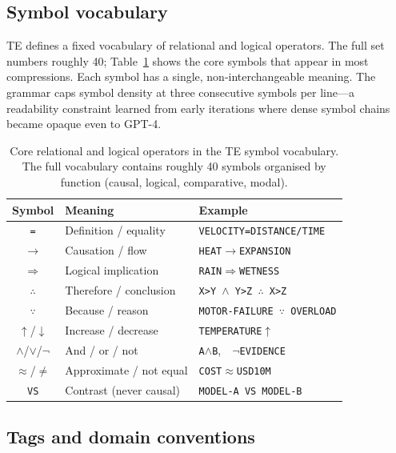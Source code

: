 \documentclass{article}
\newcommand{\teArrow}{\ensuremath{\rightarrow}}
\newcommand{\teImplies}{\ensuremath{\Rightarrow}}
\newcommand{\teTherefore}{\ensuremath{\therefore}}
\newcommand{\teBecause}{\ensuremath{\because}}
\newcommand{\teUp}{\ensuremath{\uparrow}}
\newcommand{\teDown}{\ensuremath{\downarrow}}
\newcommand{\teAnd}{\ensuremath{\wedge}}
\newcommand{\teOr}{\ensuremath{\vee}}
\newcommand{\teNot}{\ensuremath{\neg}}
\newcommand{\teApprox}{\ensuremath{\approx}}
\newcommand{\teNeq}{\ensuremath{\neq}}
\begin{document}
\subsection{Symbol vocabulary}

TE defines a fixed vocabulary of relational and logical operators. The full set numbers roughly 40; Table~\ref{tab:symbols} shows the core symbols that appear in most compressions. Each symbol has a single, non-interchangeable meaning. The grammar caps symbol density at three consecutive symbols per line---a readability constraint learned from early iterations where dense symbol chains became opaque even to GPT-4.

\begin{table}[h]
  \caption{Core relational and logical operators in the TE symbol vocabulary. The full vocabulary contains roughly 40 symbols organised by function (causal, logical, comparative, modal).}
  \label{tab:symbols}
  \centering
  \small
  \begin{tabular}{cll}
    \toprule
    Symbol & Meaning & Example \\
    \midrule
    \texttt{=} & Definition / equality & \texttt{VELOCITY=DISTANCE/TIME} \\
    \teArrow{} & Causation / flow & \texttt{HEAT\teArrow{}EXPANSION} \\
    \teImplies{} & Logical implication & \texttt{RAIN\teImplies{}WETNESS} \\
    \teTherefore{} & Therefore / conclusion & \texttt{X>Y \teAnd{} Y>Z \teTherefore{} X>Z} \\
    \teBecause{} & Because / reason & \texttt{MOTOR-FAILURE \teBecause{} OVERLOAD} \\
    \teUp{}/\teDown{} & Increase / decrease & \texttt{TEMPERATURE\teUp{}} \\
    \teAnd{}/\teOr{}/\teNot{} & And / or / not & \texttt{A\teAnd{}B},~~\texttt{\teNot{}EVIDENCE} \\
    \teApprox{}/\teNeq{} & Approximate / not equal & \texttt{COST\teApprox{}USD10M} \\
    \texttt{VS} & Contrast (never causal) & \texttt{MODEL-A VS MODEL-B} \\
    \bottomrule
  \end{tabular}
\end{table}

\subsection{Tags and domain conventions}
\end{document}
